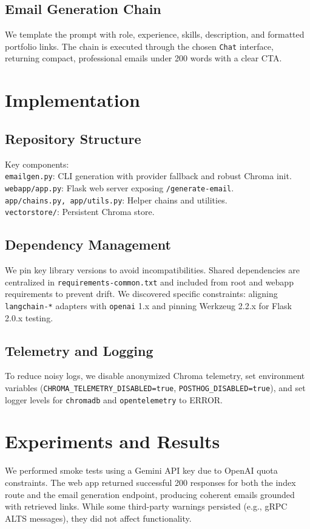 \documentclass[conference]{IEEEtran}
\begin{document}
\subsection{Email Generation Chain}
We template the prompt with role, experience, skills, description, and formatted portfolio links. The chain is executed through the chosen \texttt{Chat} interface, returning compact, professional emails under 200 words with a clear CTA.

\section{Implementation}
\subsection{Repository Structure}
Key components:\\
\texttt{emailgen.py}: CLI generation with provider fallback and robust Chroma init.\\
\texttt{webapp/app.py}: Flask web server exposing \texttt{/generate-email}.\\
\texttt{app/chains.py, app/utils.py}: Helper chains and utilities.\\
\texttt{vectorstore/}: Persistent Chroma store.

\subsection{Dependency Management}
We pin key library versions to avoid incompatibilities. Shared dependencies are centralized in \texttt{requirements-common.txt} and included from root and webapp requirements to prevent drift. We discovered specific constraints: aligning \texttt{langchain-*} adapters with \texttt{openai} 1.x and pinning Werkzeug 2.2.x for Flask 2.0.x testing.

\subsection{Telemetry and Logging}
To reduce noisy logs, we disable anonymized Chroma telemetry, set environment variables (\texttt{CHROMA\_TELEMETRY\_DISABLED=true}, \texttt{POSTHOG\_DISABLED=true}), and set logger levels for \texttt{chromadb} and \texttt{opentelemetry} to ERROR.

\section{Experiments and Results}
We performed smoke tests using a Gemini API key due to OpenAI quota constraints. The web app returned successful 200 responses for both the index route and the email generation endpoint, producing coherent emails grounded with retrieved links. While some third-party warnings persisted (e.g., gRPC ALTS messages), they did not affect functionality.
\end{document}
